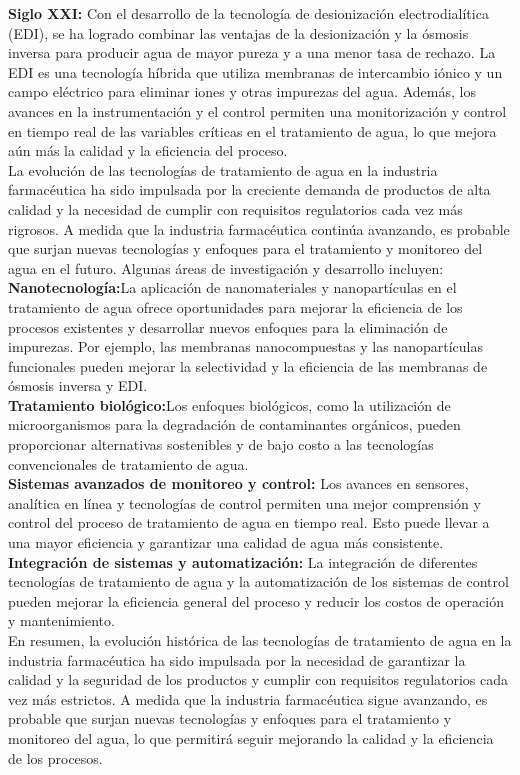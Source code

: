 \textbf{Siglo XXI:} Con el desarrollo de la tecnología de desionización electrodialítica (EDI), se ha logrado combinar las ventajas de la desionización y la ósmosis inversa para producir agua de mayor pureza y a una menor tasa de rechazo. La EDI es una tecnología híbrida que utiliza membranas de intercambio iónico y un campo eléctrico para eliminar iones y otras impurezas del agua. Además, los avances en la instrumentación y el control permiten una monitorización y control en tiempo real de las variables críticas en el tratamiento de agua, lo que mejora aún más la calidad y la eficiencia del proceso.\\


La evolución de las tecnologías de tratamiento de agua en la industria farmacéutica ha sido impulsada por la creciente demanda de productos de alta calidad y la necesidad de cumplir con requisitos regulatorios cada vez más rigrosos. A medida que la industria farmacéutica continúa avanzando, es probable que surjan nuevas tecnologías y enfoques para el tratamiento y monitoreo del agua en el futuro. Algunas áreas de investigación y desarrollo incluyen:\\

\textbf{Nanotecnología:}La aplicación de nanomateriales y nanopartículas en el tratamiento de agua ofrece oportunidades para mejorar la eficiencia de los procesos existentes y desarrollar nuevos enfoques para la eliminación de impurezas. Por ejemplo, las membranas nanocompuestas y las nanopartículas funcionales pueden mejorar la selectividad y la eficiencia de las membranas de ósmosis inversa y EDI.\\

\textbf{Tratamiento biológico:}Los enfoques biológicos, como la utilización de microorganismos para la degradación de contaminantes orgánicos, pueden proporcionar alternativas sostenibles y de bajo costo a las tecnologías convencionales de tratamiento de agua.\\

\textbf{Sistemas avanzados de monitoreo y control:} Los avances en sensores, analítica en línea y tecnologías de control permiten una mejor comprensión y control del proceso de tratamiento de agua en tiempo real. Esto puede llevar a una mayor eficiencia y garantizar una calidad de agua más consistente.\\

\textbf{Integración de sistemas y automatización:} La integración de diferentes tecnologías de tratamiento de agua y la automatización de los sistemas de control pueden mejorar la eficiencia general del proceso y reducir los costos de operación y mantenimiento.\\


En resumen, la evolución histórica de las tecnologías de tratamiento de agua en la industria farmacéutica ha sido impulsada por la necesidad de garantizar la calidad y la seguridad de los productos y cumplir con requisitos regulatorios cada vez más estrictos. A medida que la industria farmacéutica sigue avanzando, es probable que surjan nuevas tecnologías y enfoques para el tratamiento y monitoreo del agua, lo que permitirá seguir mejorando la calidad y la eficiencia de los procesos.

